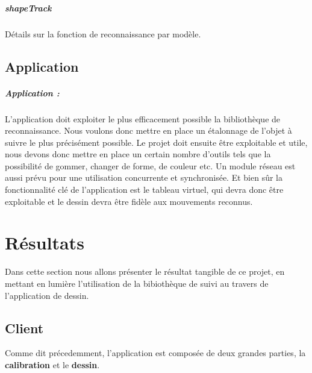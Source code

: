 \documentclass{report}
\begin{document}
						\paragraph{shapeTrack} \paragraph{}
						Détails sur la fonction de reconnaissance par modèle.
						
		\section{Application}
	\paragraph{Application :\\}
L'application doit exploiter le plus efficacement possible la bibliothèque de reconnaissance. Nous voulons donc mettre en place un étalonnage de l'objet à suivre le plus précisément possible. Le projet doit ensuite être exploitable et utile, nous devons donc mettre en place un certain nombre d'outils tels que la possibilité de gommer, changer de forme, de couleur etc. 
Un module réseau est aussi prévu pour une utilisation concurrente et synchronisée. Et bien sûr la fonctionnalité clé de l'application est le tableau virtuel, qui devra donc être exploitable et le dessin devra être fidèle aux mouvements reconnus.
	\chapter{Résultats}
		Dans cette section nous allons présenter le résultat tangible de ce projet, en mettant en lumière l'utilisation de la bibiothèque de suivi au travers de l'application de dessin.
		\section{Client}
			Comme dit précedemment, l'application est composée de deux grandes parties, la \textbf{calibration} et le \textbf{dessin}.
\end{document}
